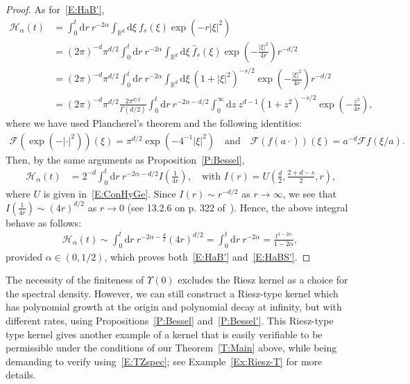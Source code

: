 \documentclass[sn-mathphys]{sn-jnl}%
\renewcommand{\R}{\mathbb{R}}
\newcommand{\ud}{\ensuremath{\mathrm{d}}}
\numberwithin{equation}{section}
\theoremstyle{thmstyleone}%
\theoremstyle{thmstyletwo}%
\theoremstyle{thmstylethree}%
\begin{document}
\begin{proof}
  As for~\eqref{E:HaB'},
	\begin{align*}
        \mathcal{H}_\alpha(t)
    & = \int_{0}^t \ud r \: r^{-2\alpha} \int_{\R^d} \ud \xi \: f_{s}(\xi) \exp\left(-r\lvert\xi\rvert^2\right)                                                                 \\
    & = (2\pi)^{-d} \pi^{d/2} \int_{0}^t \ud r \: r^{-2\alpha} \int_{\R^d} \ud \xi \: \widehat{f}_{s}(\xi) \exp\left(-\frac{\lvert\xi\rvert^2}{4r}\right) r^{-d/2}              \\
    & = (2\pi)^{-d} \pi^{d/2} \int_{0}^t \ud r \: r^{-2\alpha} \int_{\R^d} \ud \xi \: \left(1 + \lvert\xi\rvert^2\right)^{-s / 2} \exp\left(-\frac{\lvert\xi\rvert^2}{4r}\right) r^{-d/2} \\
    & = (2\pi)^{-d} \pi^{d/2} \frac{2 \pi^{d/2}}{\Gamma\left(d/2\right)} \int_{0}^t \ud r \: r^{-2\alpha - d/2} \int_0^{\infty} \ud z \: z^{d-1} \left(1 + z^2\right)^{-s/2} \exp\left(-\frac{z^2}{4r}\right),
\end{align*}
  where we have used Plancherel's theorem and the following identities:
	\begin{align*}
    \mathcal{F}\left(\exp(-\lvert \cdot \rvert^2)\right)(\xi) = \pi^{d/2} \exp\left(-4^{-1}\lvert\xi\rvert^2\right) \quad \text{and} \quad
    \mathcal{F}(f(a\cdot))(\xi) = a^{-d}\mathcal{F}f(\xi / a).
	\end{align*}
  Then, by the same arguments as Proposition~\ref{P:Bessel},
	\begin{align*}
        \mathcal{H}_\alpha(t)
     & = 2^{-d} \int_{0}^t \ud r \: r^{-2\alpha - d/2} I\left(\frac{1}{4r}\right),
      \quad \text{with $I(r) = U\left(\frac{d}{2}, \frac{2+d-s}{2}, r\right)$,}
	\end{align*}
  where $U$ is given in~\eqref{E:ConHyGe}. Since $I(r) \sim r^{-d/2}$ as $r \to \infty$, we see that
  $I\left(\frac{1}{4r}\right) \sim (4r)^{d/2}$ as $r \to 0$ (see 13.2.6 on p. 322
  of~\cite{olver.lozier.ea:10:nist}). Hence, the above integral behave as follows:
	\begin{align*}
     \mathcal{H}_\alpha(t)
     \sim \int_{0}^t \ud r \: r^{-2\alpha - \frac{d}{2}} (4r)^{d/2}
     = \int_{0}^t \ud r \: r^{-2\alpha}
     = \frac{t^{1-2\alpha}}{1-2\alpha},
	\end{align*}
  provided $\alpha \in (0, 1/2)$, which proves both~\eqref{E:HaB'} and~\eqref{E:HaBS'}.
\end{proof}


The necessity of the finiteness of $\Upsilon(0)$ excludes the Riesz kernel as a choice for the
spectral density. However, we can still construct a Riesz-type kernel which has polynomial growth at
the origin and polynomial decay at infinity, but with different rates, using
Propositions~\ref{P:Bessel} and~\ref{P:Bessel'}. This Riesz-type type kernel gives another example
of a kernel that is easily verifiable to be permissible under the conditions of our
Theorem~\ref{T:Main} above, while being demanding to verify using~\eqref{E:TZspec}; see
Example~\ref{Ex:Riesz-T} for more details.
\end{document}
